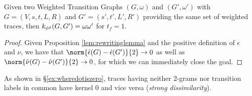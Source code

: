 \begin{lemma}
	Given two Weighted Transition Graphs $(G,\omega)$ and $(G',\omega')$ with $G=(V,s,t,L,R)$ and $G'=(s',t',L',R')$ providing the same set of weighted traces, then $k_{{\phi^{g}}}(G,G')=\omega\omega'$ for $t_f=1$.
\end{lemma}
\begin{proof}
	Given Proposition \ref{lem:rewritinglemma} and the positive definition of $\epsilon$ and $\nu$,  we have that $\norm{\hat{\epsilon}(G)-\hat{\epsilon}(G')}{2}\to 0$ as well as $\norm{\hat{\nu}(G)-\hat{\nu}(G')}{2}\to 0$, for which we can immediately close the goal.
\end{proof}

As shown in \S\ref{ex:wheredotiszero}, traces having neither $2$-grams nor transition labels in common have kernel $0$ and vice versa (\textit{strong dissimilarity}). 

